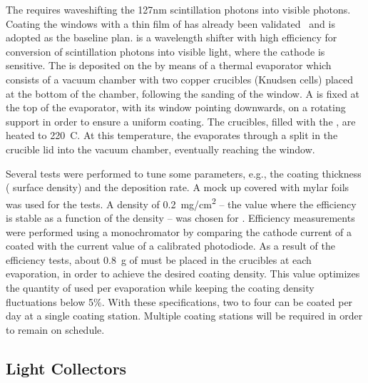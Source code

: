 The   requires waveshifting the \si{127}{nm} scintillation photons into visible photons. %
Coating the  windows with a thin film of  
has already been validated~\cite{tpb} and is adopted as the baseline plan.  is a wavelength shifter with high efficiency for conversion of \lar scintillation  photons into visible light, where the  cathode is sensitive. The  is deposited on the  by means of a thermal evaporator which consists of a vacuum chamber with two copper crucibles (Knudsen cells) placed at the bottom of the chamber, following the sanding of the  window. A  is fixed at the top of the evaporator, with its window pointing downwards, on a rotating support in order to ensure a uniform coating. The crucibles, filled with the , are heated to \SI{220}{C}. At this temperature, the  evaporates through a split in the crucible lid into the vacuum chamber, eventually reaching the  window.

Several tests were performed to tune some parameters, e.g., the coating thickness ( surface density) and the deposition rate. A  mock up covered with mylar foils was used for the tests. A  density of \SI{0.2}{mg/cm^2} -- the value where the  efficiency is stable as a function of the density -- was chosen for . Efficiency measurements were performed using a  monochromator by comparing the cathode current of a coated  with the current value of a calibrated photodiode. As a result of the efficiency tests, about \SI{0.8}{g} of  must be placed in the crucibles at each evaporation, in order to achieve the desired  coating density. %
This value optimizes the quantity of  used per evaporation while keeping %
the coating density fluctuations below \num{5}$\%$. With these specifications, two to four  can be coated per day at a single coating station. %
Multiple coating stations will be required in order to remain on schedule. %

\subsection{Light Collectors}
\label{sec:fddp-pd-2.5}


